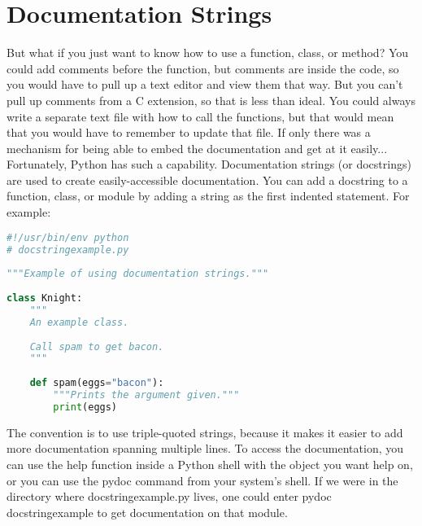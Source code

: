 \section{Documentation Strings}
But what if you just want to know how to use a function, class, or method? You
could add comments before the function, but comments are inside the code, so you
would have to pull up a text editor and view them that way. But you can't pull
up comments from a C extension, so that is less than ideal. You could always
write a separate text file with how to call the functions, but that would mean
that you would have to remember to update that file. If only there was a
mechanism for being able to embed the documentation and get at it easily...
Fortunately, Python has such a capability. Documentation strings (or docstrings)
are used to create easily-accessible documentation. You can add a docstring to a
function, class, or module by adding a string as the first indented statement.
For example:
\lstset{basicstyle=\scriptsize, numbers=left, captionpos=b, tabsize=4}
\begin{lstlisting}[caption=Documentation String,language={Python},
xleftmargin=15pt, label=lst:documentationstring]
#!/usr/bin/env python
# docstringexample.py
 
"""Example of using documentation strings."""
 
class Knight:
    """
    An example class.
 
    Call spam to get bacon.
    """
 
    def spam(eggs="bacon"):
        """Prints the argument given."""
        print(eggs)
\end{lstlisting}

The convention is to use triple-quoted strings, because it makes it easier to
add more documentation spanning multiple lines.  To access the documentation,
you can use the help function inside a Python shell with the object you want
help on, or you can use the pydoc command from your system's shell. If we were
in the directory where docstringexample.py lives, one could enter pydoc
docstringexample to get documentation on that module.
